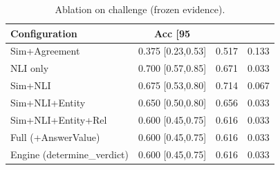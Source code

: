 \begin{table}[t]
\centering
\caption{Ablation on challenge (frozen evidence).}
\label{tab:ablation_challenge}
\small
\begin{tabular}{lccc}
\hline
Configuration & Acc [95\\%
\hline
Sim+Agreement & 0.375 [0.23,0.53] & 0.517 & 0.133 \\
NLI only & 0.700 [0.57,0.85] & 0.671 & 0.033 \\
Sim+NLI & 0.675 [0.53,0.80] & 0.714 & 0.067 \\
Sim+NLI+Entity & 0.650 [0.50,0.80] & 0.656 & 0.033 \\
Sim+NLI+Entity+Rel & 0.600 [0.45,0.75] & 0.616 & 0.033 \\
Full (+AnswerValue) & 0.600 [0.45,0.75] & 0.616 & 0.033 \\
Engine (determine\_verdict) & 0.600 [0.45,0.75] & 0.616 & 0.033 \\
\hline
\end{tabular}
\end{table}
